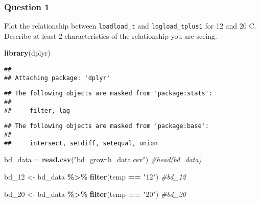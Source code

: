 \documentclass[
]{article}
\newenvironment{Shaded}{\begin{snugshade}}{\end{snugshade}}
\newcommand{\CommentTok}[1]{\textcolor[rgb]{0.56,0.35,0.01}{\textit{#1}}}
\newcommand{\FunctionTok}[1]{\textcolor[rgb]{0.13,0.29,0.53}{\textbf{#1}}}
\newcommand{\NormalTok}[1]{#1}
\newcommand{\OtherTok}[1]{\textcolor[rgb]{0.56,0.35,0.01}{#1}}
\newcommand{\SpecialCharTok}[1]{\textcolor[rgb]{0.81,0.36,0.00}{\textbf{#1}}}
\newcommand{\StringTok}[1]{\textcolor[rgb]{0.31,0.60,0.02}{#1}}
\begin{document}
\subsubsection{Question 1}\label{question-1}

Plot the relationship between \texttt{loadload\_t} and
\texttt{logload\_tplus1} for 12 and 20 C. Describe at least 2
characteristics of the relationship you are seeing.

\begin{Shaded}
\begin{Highlighting}[]
\FunctionTok{library}\NormalTok{(dplyr)}
\end{Highlighting}
\end{Shaded}

\begin{verbatim}
## 
## Attaching package: 'dplyr'
\end{verbatim}

\begin{verbatim}
## The following objects are masked from 'package:stats':
## 
##     filter, lag
\end{verbatim}

\begin{verbatim}
## The following objects are masked from 'package:base':
## 
##     intersect, setdiff, setequal, union
\end{verbatim}

\begin{Shaded}
\begin{Highlighting}[]
\NormalTok{bd\_data }\OtherTok{=} \FunctionTok{read.csv}\NormalTok{(}\StringTok{"bd\_growth\_data.csv"}\NormalTok{)}
\CommentTok{\#head(bd\_data)}

\NormalTok{bd\_12 }\OtherTok{\textless{}{-}}\NormalTok{ bd\_data }\SpecialCharTok{\%\textgreater{}\%} \FunctionTok{filter}\NormalTok{(temp }\SpecialCharTok{==} \StringTok{"12"}\NormalTok{)}
\CommentTok{\#bd\_12}

\NormalTok{bd\_20 }\OtherTok{\textless{}{-}}\NormalTok{ bd\_data }\SpecialCharTok{\%\textgreater{}\%} \FunctionTok{filter}\NormalTok{(temp }\SpecialCharTok{==} \StringTok{"20"}\NormalTok{)}
\CommentTok{\#bd\_20}
\end{Highlighting}
\end{Shaded}
\end{document}
